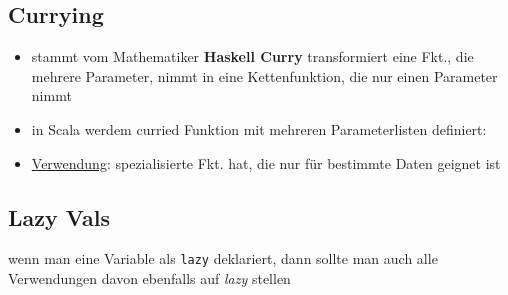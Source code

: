 \subsection{Currying}
\begin{itemize}
  \item stammt vom Mathematiker \textbf{Haskell Curry} \und transformiert
  eine Fkt., die mehrere Parameter, nimmt in eine Kettenfunktion, die 
  nur einen Parameter nimmt
  \item in Scala werdem curried Funktion mit mehreren Parameterlisten
  definiert:
  
  
  
  \item \uline{Verwendung}: spezialisierte Fkt. hat, die nur für 
  bestimmte Daten geignet ist
\end{itemize}


\subsection{Lazy Vals}
wenn man eine Variable als \texttt{lazy} deklariert, dann sollte
man auch alle Verwendungen davon ebenfalls auf \textit{lazy} stellen 

 
\pagebreak


